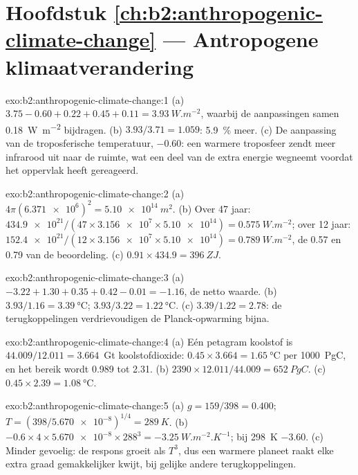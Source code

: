 \section*{Hoofdstuk \ref{ch:b2:anthropogenic-climate-change} --- Antropogene klimaatverandering}

\begin{solution}{exo:b2:anthropogenic-climate-change:1}
(a) $3.75 - 0.60 + 0.22 + 0.45 + 0.11 = \qty{3.93}{W.m^{-2}}$, waarbij de aanpassingen samen
\qty{0.18}{W.m^{-2}} bijdragen. (b) $3.93/3.71 = 1.059$: \qty{5.9}{\percent} meer. (c) De aanpassing van de
troposferische temperatuur, $-0.60$: een warmere troposfeer zendt meer infrarood uit naar de ruimte, wat
een deel van de extra energie wegneemt voordat het oppervlak heeft gereageerd.
\end{solution}

\begin{solution}{exo:b2:anthropogenic-climate-change:2}
(a) $4\pi(\num{6.371e6})^2 = \qty{5.10e14}{m^2}$. (b) Over 47 jaar: $\num{434.9e21}/(47 \times
\num{3.156e7} \times \num{5.10e14}) = \qty{0.575}{W.m^{-2}}$; over 12 jaar: $\num{152.4e21}/(12
\times \num{3.156e7} \times \num{5.10e14}) = \qty{0.789}{W.m^{-2}}$, de 0.57 en 0.79 van de
beoordeling. (c) $0.91 \times 434.9 = \qty{396}{ZJ}$.
\end{solution}

\begin{solution}{exo:b2:anthropogenic-climate-change:3}
(a) $-3.22 + 1.30 + 0.35 + 0.42 - 0.01 = \num{-1.16}$, de netto waarde. (b) $3.93/1.16 =
\qty{3.39}{\celsius}$; $3.93/3.22 = \qty{1.22}{\celsius}$. (c) $3.39/1.22 = 2.78$: de terugkoppelingen
verdrievoudigen de Planck-opwarming bijna.
\end{solution}

\begin{solution}{exo:b2:anthropogenic-climate-change:4}
(a) Eén petagram koolstof is $44.009/12.011 = 3.664$~Gt koolstofdioxide: $0.45 \times 3.664 =
\qty{1.65}{\celsius}$ per \qty{1000}{PgC}, en het bereik wordt 0.989 tot 2.31. (b) $2390 \times
12.011/44.009 = \qty{652}{PgC}$. (c) $0.45 \times 2.39 = \qty{1.08}{\celsius}$.
\end{solution}

\begin{solution}{exo:b2:anthropogenic-climate-change:5}
(a) $g = 159/398 = 0.400$; $T = (398/\num{5.670e-8})^{1/4} = \qty{289}{K}$. (b) $-0.6 \times 4
\times \num{5.670e-8} \times 288^3 = \qty{-3.25}{W.m^{-2}.K^{-1}}$; bij \qty{298}{K} $-3.60$.
(c) Minder gevoelig: de respons groeit als $T^3$, dus een warmere planeet raakt elke extra graad
gemakkelijker kwijt, bij gelijke andere terugkoppelingen.
\end{solution}

